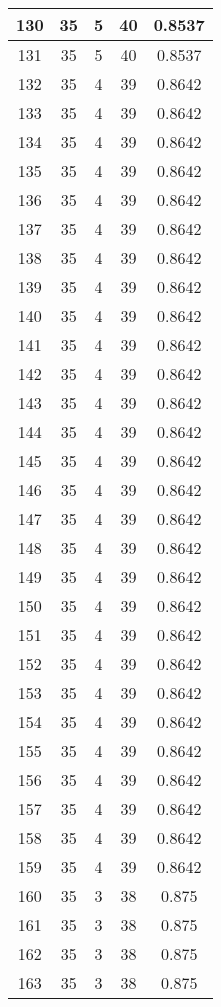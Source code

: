 \documentclass[letterpaper, 12pt]{article}
\begin{document}
\begin{longtable}{|c|c|c|c|c|}
\hline
130 & 35 & 5 & 40 & 0.8537 \\
\hline
131 & 35 & 5 & 40 & 0.8537 \\
\hline
132 & 35 & 4 & 39 & 0.8642 \\
\hline
133 & 35 & 4 & 39 & 0.8642 \\
\hline
134 & 35 & 4 & 39 & 0.8642 \\
\hline
135 & 35 & 4 & 39 & 0.8642 \\
\hline
136 & 35 & 4 & 39 & 0.8642 \\
\hline
137 & 35 & 4 & 39 & 0.8642 \\
\hline
138 & 35 & 4 & 39 & 0.8642 \\
\hline
139 & 35 & 4 & 39 & 0.8642 \\
\hline
140 & 35 & 4 & 39 & 0.8642 \\
\hline
141 & 35 & 4 & 39 & 0.8642 \\
\hline
142 & 35 & 4 & 39 & 0.8642 \\
\hline
143 & 35 & 4 & 39 & 0.8642 \\
\hline
144 & 35 & 4 & 39 & 0.8642 \\
\hline
145 & 35 & 4 & 39 & 0.8642 \\
\hline
146 & 35 & 4 & 39 & 0.8642 \\
\hline
147 & 35 & 4 & 39 & 0.8642 \\
\hline
148 & 35 & 4 & 39 & 0.8642 \\
\hline
149 & 35 & 4 & 39 & 0.8642 \\
\hline
150 & 35 & 4 & 39 & 0.8642 \\
\hline
151 & 35 & 4 & 39 & 0.8642 \\
\hline
152 & 35 & 4 & 39 & 0.8642 \\
\hline
153 & 35 & 4 & 39 & 0.8642 \\
\hline
154 & 35 & 4 & 39 & 0.8642 \\
\hline
155 & 35 & 4 & 39 & 0.8642 \\
\hline
156 & 35 & 4 & 39 & 0.8642 \\
\hline
157 & 35 & 4 & 39 & 0.8642 \\
\hline
158 & 35 & 4 & 39 & 0.8642 \\
\hline
159 & 35 & 4 & 39 & 0.8642 \\
\hline
160 & 35 & 3 & 38 & 0.875 \\
\hline
161 & 35 & 3 & 38 & 0.875 \\
\hline
162 & 35 & 3 & 38 & 0.875 \\
\hline
163 & 35 & 3 & 38 & 0.875 \\

\end{longtable}
\end{document}
